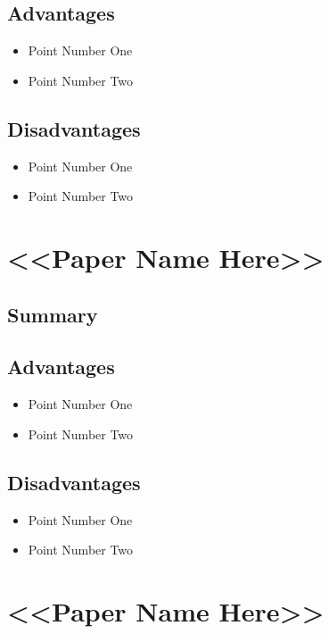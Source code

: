 \subsection{Advantages}
\begin{itemize}
\item{Point Number One}
\item{Point Number Two}
\end{itemize}

\subsection{Disadvantages}
\begin{itemize}
\item{Point Number One}
\item{Point Number Two}
\end{itemize}


\section{<<Paper Name Here>>}
\subsection{Summary}

\subsection{Advantages}
\begin{itemize}
\item{Point Number One}
\item{Point Number Two}
\end{itemize}

\subsection{Disadvantages}
\begin{itemize}
\item{Point Number One}
\item{Point Number Two}
\end{itemize}



\section{<<Paper Name Here>>}
